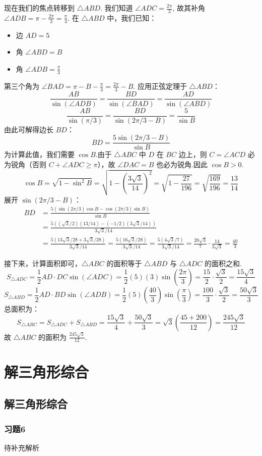 \begin{solution}
	现在我们的焦点转移到 $\triangle ABD$.
	我们知道 $\angle ADC = \frac{2\pi}{3}$, 故其补角 $\angle ADB = \pi - \frac{2\pi}{3} = \frac{\pi}{3}$.
	在 $\triangle ABD$ 中，我们已知：
	\begin{itemize}
		\item 边 $AD = 5$
		\item 角 $\angle ABD = B$
		\item 角 $\angle ADB = \frac{\pi}{3}$
	\end{itemize}
	第三个角为 $\angle BAD = \pi - B - \frac{\pi}{3} = \frac{2\pi}{3}-B$.
	应用正弦定理于 $\triangle ABD$：
	\[
	\frac{AB}{\sin(\angle ADB)} = \frac{BD}{\sin(\angle BAD)} = \frac{AD}{\sin(\angle ABD)}
	\]
	\[
	\frac{AB}{\sin(\pi/3)} = \frac{BD}{\sin(2\pi/3 - B)} = \frac{5}{\sin B}
	\]
	由此可解得边长 $BD$：
	\[
	BD = \frac{5\sin(2\pi/3 - B)}{\sin B}
	\]
	为计算此值，我们需要 $\cos B$.由于 $\triangle ABC$ 中 $D$ 在 $BC$ 边上，则 $C = \angle ACD$ 必为锐角（否则 $C+\angle ADC \ge \pi$），故 $\angle DAC = B$ 也必为锐角.因此 $\cos B > 0$.
	\[
	\cos B = \sqrt{1-\sin^2 B} = \sqrt{1 - \left(\frac{3\sqrt{3}}{14}\right)^2} = \sqrt{1-\frac{27}{196}} = \sqrt{\frac{169}{196}} = \frac{13}{14}
	\]
	展开 $\sin(2\pi/3 - B)$：
	\begin{align*}
		BD &= \frac{5(\sin(2\pi/3)\cos B - \cos(2\pi/3)\sin B)}{\sin B} \\
		&= \frac{5((\sqrt{3}/2)(13/14) - (-1/2)(3\sqrt{3}/14))}{3\sqrt{3}/14} \\
		&= \frac{5(13\sqrt{3}/28 + 3\sqrt{3}/28)}{3\sqrt{3}/14} = \frac{5(16\sqrt{3}/28)}{3\sqrt{3}/14} = \frac{5(4\sqrt{3}/7)}{3\sqrt{3}/14} = \frac{20\sqrt{3}}{7} \cdot \frac{14}{3\sqrt{3}} = \frac{40}{3}
	\end{align*}
	
	接下来，计算面积即可，$\triangle ABC$ 的面积等于 $\triangle ABD$ 与 $\triangle ADC$ 的面积之和.
	\[
	S_{\triangle ADC} = \frac{1}{2}AD \cdot DC \sin(\angle ADC) = \frac{1}{2}(5)(3)\sin\left(\frac{2\pi}{3}\right) = \frac{15}{2} \cdot \frac{\sqrt{3}}{2} = \frac{15\sqrt{3}}{4}
	\]
	\[
	S_{\triangle ABD} = \frac{1}{2}AD \cdot BD \sin(\angle ADB) = \frac{1}{2}(5)\left(\frac{40}{3}\right)\sin\left(\frac{\pi}{3}\right) = \frac{100}{3} \cdot \frac{\sqrt{3}}{2} = \frac{50\sqrt{3}}{3}
	\]
	总面积为：
	\[
	S_{\triangle ABC} = S_{\triangle ADC} + S_{\triangle ABD} = \frac{15\sqrt{3}}{4} + \frac{50\sqrt{3}}{3} = \sqrt{3}\left(\frac{45+200}{12}\right) = \frac{245\sqrt{3}}{12}
	\]
		故 $\triangle ABC$ 的面积为 $\frac{245\sqrt{3}}{12}$.\hfill\qedsymbol
	\end{solution}

	\section{解三角形综合}

	\subsection*{解三角形综合}

	\subsubsection{习题6}
	\begin{solution}
		待补充解析
	\end{solution}
